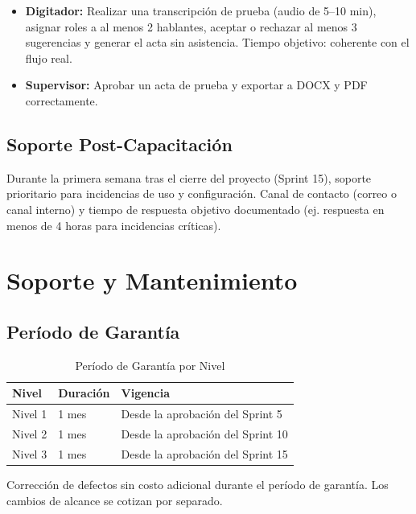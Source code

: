 \documentclass[12pt,a4paper]{report}
\begin{document}
\begin{itemize}
    \item \textbf{Digitador:} Realizar una transcripción de prueba (audio de 5--10 min), asignar roles a al menos 2 hablantes, aceptar o rechazar al menos 3 sugerencias y generar el acta sin asistencia. Tiempo objetivo: coherente con el flujo real.
    \item \textbf{Supervisor:} Aprobar un acta de prueba y exportar a DOCX y PDF correctamente.
\end{itemize}

\section{Soporte Post-Capacitación}

Durante la primera semana tras el cierre del proyecto (Sprint 15), soporte prioritario para incidencias de uso y configuración. Canal de contacto (correo o canal interno) y tiempo de respuesta objetivo documentado (ej. respuesta en menos de 4 horas para incidencias críticas).

\chapter{Soporte y Mantenimiento}

\section{Período de Garantía}

\begin{table}[H]
\centering
\small
\begin{tabular}{|p{2.5cm}|p{2.5cm}|p{8cm}|}
\hline
\rowcolor{primaryblue!20}
\textbf{Nivel} & \textbf{Duración} & \textbf{Vigencia} \\
\hline
Nivel 1 & 1 mes & Desde la aprobación del Sprint 5 \\
\hline
Nivel 2 & 1 mes & Desde la aprobación del Sprint 10 \\
\hline
Nivel 3 & 1 mes & Desde la aprobación del Sprint 15 \\
\hline
\end{tabular}
\caption{Período de Garantía por Nivel}
\end{table}

Corrección de defectos sin costo adicional durante el período de garantía. Los cambios de alcance se cotizan por separado.
\end{document}
